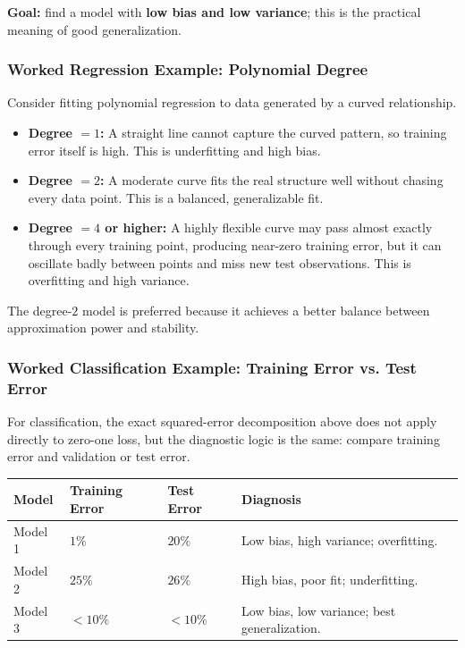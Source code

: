 \documentclass[12pt,openany]{book}
\begin{document}
\textbf{Goal:} find a model with \textbf{low bias and low variance}; this is the practical meaning of good generalization.

\subsubsection{Worked Regression Example: Polynomial Degree}

Consider fitting polynomial regression to data generated by a curved relationship.

\begin{itemize}[leftmargin=*]
    \item \textbf{Degree \(=1\):} A straight line cannot capture the curved pattern, so training error itself is high. This is underfitting and high bias.
    \item \textbf{Degree \(=2\):} A moderate curve fits the real structure well without chasing every data point. This is a balanced, generalizable fit.
    \item \textbf{Degree \(=4\) or higher:} A highly flexible curve may pass almost exactly through every training point, producing near-zero training error, but it can oscillate badly between points and miss new test observations. This is overfitting and high variance.
\end{itemize}

The degree-\(2\) model is preferred because it achieves a better balance between approximation power and stability.

\subsubsection{Worked Classification Example: Training Error vs. Test Error}

For classification, the exact squared-error decomposition above does not apply directly to zero-one loss, but the diagnostic logic is the same: compare training error and validation or test error.

\begin{center}
\begin{tabular}{|L{0.16\textwidth}|L{0.17\textwidth}|L{0.16\textwidth}|L{0.31\textwidth}|}
\hline
\textbf{Model} & \textbf{Training Error} & \textbf{Test Error} & \textbf{Diagnosis} \\
\hline
Model 1 & \(1\%\) & \(20\%\) & Low bias, high variance; overfitting. \\
\hline
Model 2 & \(25\%\) & \(26\%\) & High bias, poor fit; underfitting. \\
\hline
Model 3 & \(<10\%\) & \(<10\%\) & Low bias, low variance; best generalization. \\
\hline
\end{tabular}
\end{center}
\end{document}
